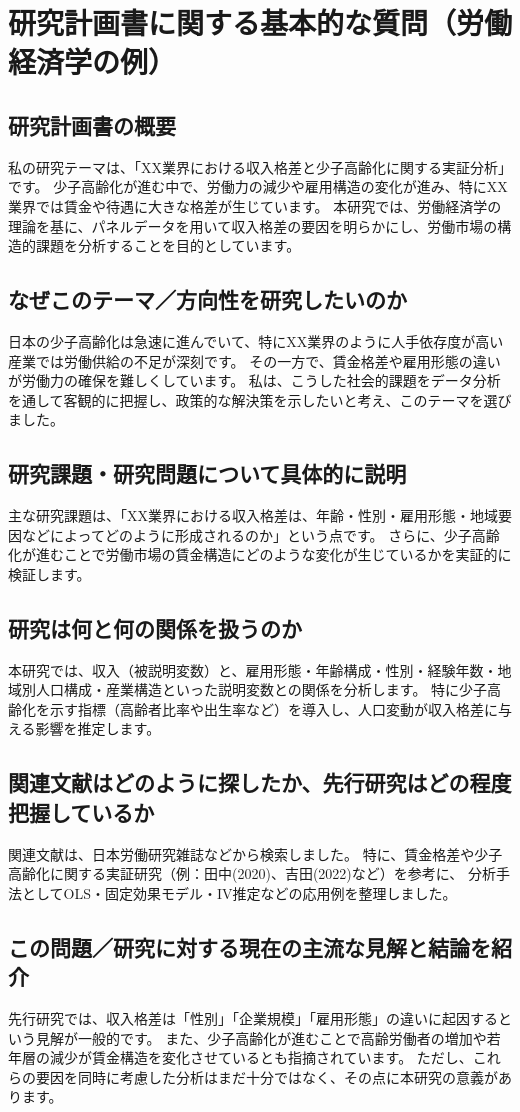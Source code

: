 \documentclass[xelatex,a4paper,base=11pt,ja=standard,jafont=noto]{bxjsreport}
\begin{document}
\chapter{研究計画書に関する基本的な質問（労働経済学の例）}

\section{研究計画書の概要}
私の研究テーマは、「XX業界における収入格差と少子高齢化に関する実証分析」です。
少子高齢化が進む中で、労働力の減少や雇用構造の変化が進み、特にXX業界では賃金や待遇に大きな格差が生じています。
本研究では、労働経済学の理論を基に、パネルデータを用いて収入格差の要因を明らかにし、労働市場の構造的課題を分析することを目的としています。
\section{なぜこのテーマ／方向性を研究したいのか}
日本の少子高齢化は急速に進んでいて、特にXX業界のように人手依存度が高い産業では労働供給の不足が深刻です。
その一方で、賃金格差や雇用形態の違いが労働力の確保を難しくしています。
私は、こうした社会的課題をデータ分析を通して客観的に把握し、政策的な解決策を示したいと考え、このテーマを選びました。
\section{研究課題・研究問題について具体的に説明}
主な研究課題は、「XX業界における収入格差は、年齢・性別・雇用形態・地域要因などによってどのように形成されるのか」という点です。
さらに、少子高齢化が進むことで労働市場の賃金構造にどのような変化が生じているかを実証的に検証します。
\section{研究は何と何の関係を扱うのか}
本研究では、収入（被説明変数）と、雇用形態・年齢構成・性別・経験年数・地域別人口構成・産業構造といった説明変数との関係を分析します。
特に少子高齢化を示す指標（高齢者比率や出生率など）を導入し、人口変動が収入格差に与える影響を推定します。
\section{関連文献はどのように探したか、先行研究はどの程度把握しているか}
関連文献は、日本労働研究雑誌などから検索しました。
特に、賃金格差や少子高齢化に関する実証研究（例：田中(2020)、吉田(2022)など）を参考に、
分析手法としてOLS・固定効果モデル・IV推定などの応用例を整理しました。
\section{この問題／研究に対する現在の主流な見解と結論を紹介}
先行研究では、収入格差は「性別」「企業規模」「雇用形態」の違いに起因するという見解が一般的です。
また、少子高齢化が進むことで高齢労働者の増加や若年層の減少が賃金構造を変化させているとも指摘されています。
ただし、これらの要因を同時に考慮した分析はまだ十分ではなく、その点に本研究の意義があります。
\end{document}
